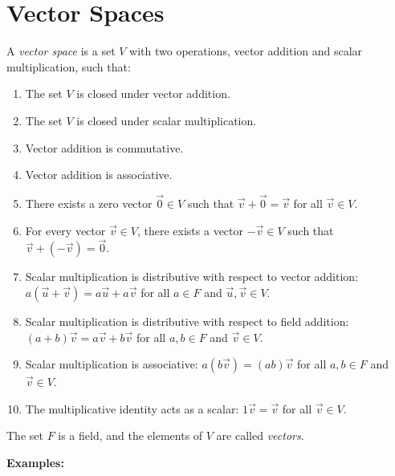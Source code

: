 \newpage
\section{Vector Spaces}

A \emph{vector space} is a set \(V\) with two operations, vector addition and scalar multiplication, 
such that:

\begin{enumerate}[label=\Roman*.]

	\item The set \(V\) is closed under vector addition.

	\item The set \(V\) is closed under scalar multiplication.

	\item Vector addition is commutative.

	\item Vector addition is associative.

	\item There exists a zero vector \(\vec{0} \in V\) such that \(\vec{v} + \vec{0} = \vec{v}\) 
		  for all \(\vec{v} \in V\).

	\item For every vector \(\vec{v} \in V\), there exists a vector \(-\vec{v} \in V\) such that 
	      \(\vec{v} + (-\vec{v}) = \vec{0}\).

	\item Scalar multiplication is distributive with respect to vector addition: 
	      \(a(\vec{u} + \vec{v}) = a\vec{u} + a\vec{v}\) for all \(a \in F\) and 
		  \(\vec{u}, \vec{v} \in V\).

	\item Scalar multiplication is distributive with respect to field addition: 
	      \((a + b)\vec{v} = a\vec{v} + b\vec{v}\) for all \(a, b \in F\) and \(\vec{v} \in V\).

	\item Scalar multiplication is associative: \(a(b\vec{v}) = (ab)\vec{v}\) for all \(a, b \in F\) 
	      and \(\vec{v} \in V\).

	\item The multiplicative identity acts as a scalar: \(1\vec{v} = \vec{v}\) for all \(\vec{v} \in V\).

\end{enumerate}

The set \(F\) is a field, and the elements of \(V\) are called \emph{vectors}.

\textbf{Examples:}

